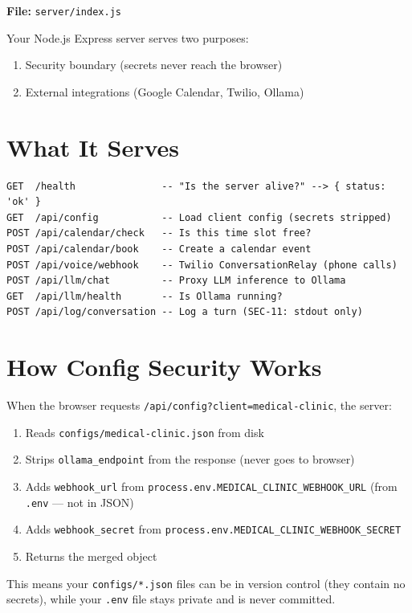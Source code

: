 \documentclass[12pt, a4paper]{report}
\newcommand{\ic}[1]{\texttt{\small\color{accentblue!70!black}#1}}
\begin{document}
\textbf{File:} \ic{server/index.js}

Your Node.js Express server serves two purposes:
\begin{enumerate}
  \item Security boundary (secrets never reach the browser)
  \item External integrations (Google Calendar, Twilio, Ollama)
\end{enumerate}

\section{What It Serves}

\begin{lstlisting}
GET  /health               -- "Is the server alive?" --> { status: 'ok' }
GET  /api/config           -- Load client config (secrets stripped)
POST /api/calendar/check   -- Is this time slot free?
POST /api/calendar/book    -- Create a calendar event
POST /api/voice/webhook    -- Twilio ConversationRelay (phone calls)
POST /api/llm/chat         -- Proxy LLM inference to Ollama
GET  /api/llm/health       -- Is Ollama running?
POST /api/log/conversation -- Log a turn (SEC-11: stdout only)
\end{lstlisting}

\section{How Config Security Works}

When the browser requests \ic{/api/config?client=medical-clinic}, the server:
\begin{enumerate}
  \item Reads \ic{configs/medical-clinic.json} from disk
  \item Strips \ic{ollama\_endpoint} from the response (never goes to browser)
  \item Adds \ic{webhook\_url} from
        \ic{process.env.MEDICAL\_CLINIC\_WEBHOOK\_URL} (from \ic{.env} --- not in JSON)
  \item Adds \ic{webhook\_secret} from
        \ic{process.env.MEDICAL\_CLINIC\_WEBHOOK\_SECRET}
  \item Returns the merged object
\end{enumerate}

This means your \ic{configs/*.json} files can be in version control (they contain no
secrets), while your \ic{.env} file stays private and is never committed.
\end{document}
